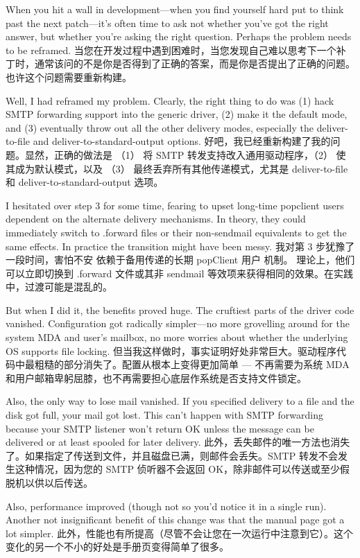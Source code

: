 \documentclass[a4paper,12pt,UTF8,twoside]{ctexbook}
\begin{document}
When you hit a wall in development—when you find yourself hard put to think past the next patch—it's often time to ask not whether you've got the right answer, but whether you're asking the right question. Perhaps the problem needs to be reframed.
当您在开发过程中遇到困难时，当您发现自己难以思考下一个补丁时，通常该问的不是你是否得到了正确的答案，而是你是否提出了正确的问题。也许这个问题需要重新构建。

Well, I had reframed my problem. Clearly, the right thing to do was (1) hack SMTP forwarding support into the generic driver, (2) make it the default mode, and (3) eventually throw out all the other delivery modes, especially the deliver-to-file and deliver-to-standard-output options.
好吧，我已经重新构建了我的问题。显然，正确的做法是 （1） 将 SMTP 转发支持改入通用驱动程序，（2） 使其成为默认模式，以及 （3） 最终丢弃所有其他传递模式，尤其是 deliver-to-file 和 deliver-to-standard-output 选项。

I hesitated over step 3 for some time, fearing to upset long-time popclient users dependent on the alternate delivery mechanisms. In theory, they could immediately switch to .forward files or their non-sendmail equivalents to get the same effects. In practice the transition might have been messy.
我对第 3 步犹豫了一段时间，害怕不安 依赖于备用传递的长期 popClient 用户 机制。 理论上，他们可以立即切换到 .forward 文件或其非 sendmail 等效项来获得相同的效果。在实践中，过渡可能是混乱的。

But when I did it, the benefits proved huge. The cruftiest parts of the driver code vanished. Configuration got radically simpler—no more grovelling around for the system MDA and user's mailbox, no more worries about whether the underlying OS supports file locking.
但当我这样做时，事实证明好处非常巨大。驱动程序代码中最粗糙的部分消失了。配置从根本上变得更加简单 — 不再需要为系统 MDA 和用户邮箱卑躬屈膝，也不再需要担心底层作系统是否支持文件锁定。

Also, the only way to lose mail vanished. If you specified delivery to a file and the disk got full, your mail got lost. This can't happen with SMTP forwarding because your SMTP listener won't return OK unless the message can be delivered or at least spooled for later delivery.
此外，丢失邮件的唯一方法也消失了。如果指定了传送到文件，并且磁盘已满，则邮件会丢失。SMTP 转发不会发生这种情况，因为您的 SMTP 侦听器不会返回 OK，除非邮件可以传送或至少假脱机以供以后传送。

Also, performance improved (though not so you'd notice it in a single run). Another not insignificant benefit of this change was that the manual page got a lot simpler.
此外，性能也有所提高（尽管不会让您在一次运行中注意到它）。这个变化的另一个不小的好处是手册页变得简单了很多。
\end{document}
